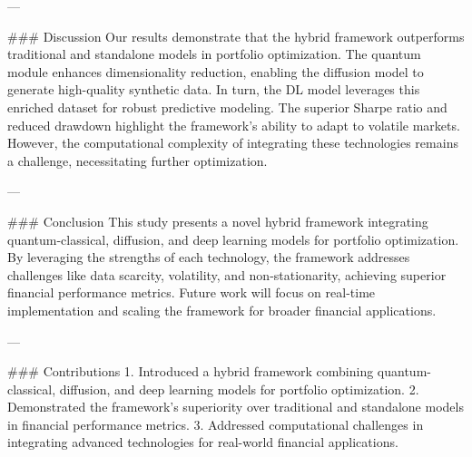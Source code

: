 ---

### Discussion  
Our results demonstrate that the hybrid framework outperforms traditional and standalone models in portfolio optimization. The quantum module enhances dimensionality reduction, enabling the diffusion model to generate high-quality synthetic data. In turn, the DL model leverages this enriched dataset for robust predictive modeling. The superior Sharpe ratio and reduced drawdown highlight the framework's ability to adapt to volatile markets. However, the computational complexity of integrating these technologies remains a challenge, necessitating further optimization.

---

### Conclusion  
This study presents a novel hybrid framework integrating quantum-classical, diffusion, and deep learning models for portfolio optimization. By leveraging the strengths of each technology, the framework addresses challenges like data scarcity, volatility, and non-stationarity, achieving superior financial performance metrics. Future work will focus on real-time implementation and scaling the framework for broader financial applications.

---

### Contributions  
1. Introduced a hybrid framework combining quantum-classical, diffusion, and deep learning models for portfolio optimization.  
2. Demonstrated the framework's superiority over traditional and standalone models in financial performance metrics.  
3. Addressed computational challenges in integrating advanced technologies for real-world financial applications.  

